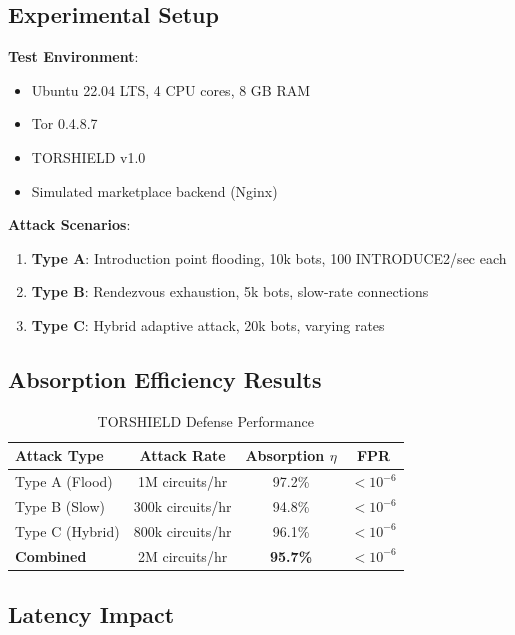 \documentclass[11pt,a4paper]{article}
\begin{document}
\subsection{Experimental Setup}

\textbf{Test Environment}:
\begin{itemize}
\item Ubuntu 22.04 LTS, 4 CPU cores, 8 GB RAM
\item Tor 0.4.8.7
\item TORSHIELD v1.0
\item Simulated marketplace backend (Nginx)
\end{itemize}

\textbf{Attack Scenarios}:
\begin{enumerate}
\item \textbf{Type A}: Introduction point flooding, 10k bots, 100 INTRODUCE2/sec each
\item \textbf{Type B}: Rendezvous exhaustion, 5k bots, slow-rate connections
\item \textbf{Type C}: Hybrid adaptive attack, 20k bots, varying rates
\end{enumerate}

\subsection{Absorption Efficiency Results}

\begin{table}[h]
\centering
\begin{tabular}{@{}lccc@{}}
\toprule
\textbf{Attack Type} & \textbf{Attack Rate} & \textbf{Absorption $\eta$} & \textbf{FPR} \\ \midrule
Type A (Flood) & 1M circuits/hr & 97.2\% & $< 10^{-6}$ \\
Type B (Slow) & 300k circuits/hr & 94.8\% & $< 10^{-6}$ \\
Type C (Hybrid) & 800k circuits/hr & 96.1\% & $< 10^{-6}$ \\
\textbf{Combined} & 2M circuits/hr & \textbf{95.7\%} & $< 10^{-6}$ \\
\bottomrule
\end{tabular}
\caption{TORSHIELD Defense Performance}
\end{table}

\subsection{Latency Impact}
\end{document}
